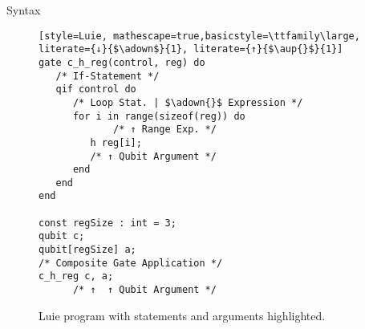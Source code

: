 \begin{frame}[fragile]{Syntax}
\begin{minipage}{.50\textwidth}
        \begin{figure}[htp]
            \centering     
            \begin{lstlisting}[style=Luie, mathescape=true,basicstyle=\ttfamily\large, literate={↓}{$\adown$}{1}, literate={↑}{$\aup{}$}{1}] 
gate c_h_reg(control, reg) do
   /* If-Statement */
   qif control do
      /* Loop Stat. | $\adown{}$ Expression */
      for i in range(sizeof(reg)) do
             /* ↑ Range Exp. */
         h reg[i];
         /* ↑ Qubit Argument */
      end
   end
end

const regSize : int = 3; 
qubit c;
qubit[regSize] a;
/* Composite Gate Application */
c_h_reg c, a;  
      /* ↑  ↑ Qubit Argument */                 
            \end{lstlisting}
            \caption{Luie program with statements and arguments highlighted.}
        \end{figure}
    \end{minipage}
\end{frame}

%         


